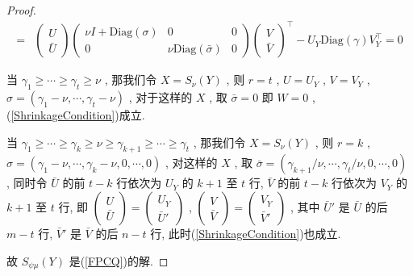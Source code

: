 \documentclass[a4paper, UTF8]{ctexart}				%
\numberwithin{equation}{section}				%
\begin{document}
\begin{proof}
\begin{equation}
\begin{split}
						=	&\begin{pmatrix}
								U \\ \bar{U}
							\end{pmatrix}
							\begin{pmatrix}
								\nu I + \text{Diag}(\sigma) & 0 & 0\\
								0 & \nu \text{Diag}(\bar{\sigma}) & 0
							\end{pmatrix}
							\begin{pmatrix}
								V \\ \bar{V}
							\end{pmatrix} ^\top 
							- U_Y \text{Diag}(\gamma) V_Y ^\top = 0
					\end{split}
				\end{equation}

				当 $\gamma_1 \ge \cdots \ge \gamma_t \ge \nu$ , 那我们令 $X = S_\nu(Y)$ , 则 $r = t$ , $U = U_Y$ , $V = V_Y$ , $\sigma = (\gamma_1 - \nu, \cdots, \gamma_t - \nu)$ , 对于这样的 $X$ , 取 $\bar{\sigma} = 0$ 即 $W = 0$ , (\ref{ShrinkageCondition})成立.

				当 $\gamma_1 \ge \cdots \ge \gamma_k \ge \nu \ge \gamma_{k + 1} \ge \cdots \ge \gamma_t$ , 那我们令 $X = S_\nu(Y)$ , 则 $r = k$ , $\sigma = (\gamma_1 - \nu, \cdots, \gamma_k - \nu, 0, \cdots, 0)$ , 对这样的 $X$ , 取 $\bar{\sigma} = (\gamma_{k + 1}/\nu, \cdots, \gamma_{t}/\nu, 0, \cdots, 0)$ , 同时令 $\bar{U}$ 的前 $t - k$ 行依次为 $U_Y$ 的 $k + 1$ 至 $t$ 行, $\bar{V}$ 的前 $t - k$ 行依次为 $V_Y$ 的 $k + 1$ 至 $t$ 行, 即 
					$
						\begin{pmatrix}
							U \\ \bar{U}
						\end{pmatrix} 
						=
						\begin{pmatrix}
							U_Y \\ \bar{U}'
						\end{pmatrix}
					$ ,
					$
						\begin{pmatrix}
							V \\ \bar{V}
						\end{pmatrix} 
						=
						\begin{pmatrix}
							V_Y \\ \bar{V}'
						\end{pmatrix}
					$ ,
				其中 $\bar{U}'$ 是 $\bar{U}$ 的后 $m - t$ 行, $\bar{V}'$ 是 $\bar{V}$ 的后 $n - t$ 行, 此时(\ref{ShrinkageCondition})也成立.

				故 $S_{\psi \mu}(Y)$ 是(\ref{FPCQ})的解.
			\end{proof}
\end{document}
